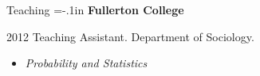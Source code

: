 \begin{rSection}{Teaching}
{\parindent=-.1in {\bf Fullerton College}}

\vspace*{-.5em} 
\begin{hangt}{2012 \datefill}
Teaching Assistant. Department of Sociology.
\vspace*{-.5em} 
\begin{itemize}[leftmargin=.25in] \vspace*{-.25em} 
\item {\footnotesize \it Probability and Statistics}
\end{itemize}
\end{hangt}

\end{rSection}







